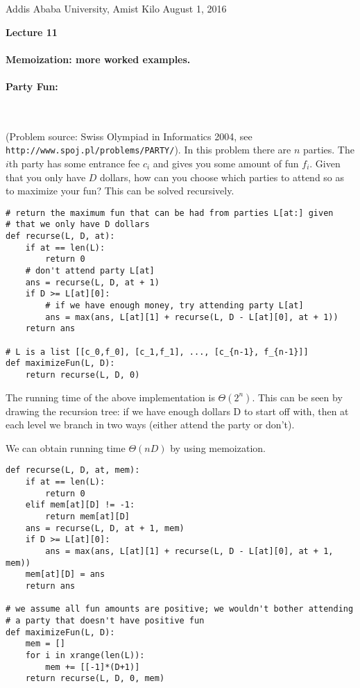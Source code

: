 \documentclass[11pt]{article}
\newlength{\toppush}
\newcommand{\htitle}[2]{\noindent\vspace*{-\toppush}\newline\parbox{6.5in}
 {\large Addis Ababa University, Amist Kilo \hfill #1\newline
\hspace*{\fill}{\bf Algorithms and Programming for High Schoolers} \hspace*{\fill} \newline
\mbox{}\hrulefill\mbox{}}\vspace*{1ex}\mbox{}\newline
\begin{center}{\Large\bf #2}\end{center}}
\begin{document}
\htitle{August 1, 2016}{Lecture 11}

\paragraph{\Large Memoization: more worked examples.}

\paragraph{Party Fun:}\ 

\smallskip

\noindent (Problem source: Swiss Olympiad in Informatics 2004, see
\texttt{http://www.spoj.pl/problems/PARTY/}).  In this problem there
are $n$ parties.  The $i$th party has some entrance fee $c_i$ and
gives you some amount of fun $f_i$.  Given that you only have $D$
dollars, how can you choose which parties to attend so as to maximize
your fun?  This can be solved recursively.

\begin{verbatim}
# return the maximum fun that can be had from parties L[at:] given
# that we only have D dollars
def recurse(L, D, at):
    if at == len(L):
        return 0
    # don't attend party L[at]
    ans = recurse(L, D, at + 1)
    if D >= L[at][0]:
        # if we have enough money, try attending party L[at]
        ans = max(ans, L[at][1] + recurse(L, D - L[at][0], at + 1))
    return ans

# L is a list [[c_0,f_0], [c_1,f_1], ..., [c_{n-1}, f_{n-1}]]
def maximizeFun(L, D):
    return recurse(L, D, 0)
\end{verbatim}

The running time of the above implementation is $\Theta(2^n)$.  This
can be seen by drawing the recursion tree: if we have enough dollars
D to start off with, then at each level we branch in two ways (either
attend the party or don't).

We can obtain running time $\Theta(nD)$ by using memoization.

\begin{verbatim}
def recurse(L, D, at, mem):
    if at == len(L):
        return 0
    elif mem[at][D] != -1:
        return mem[at][D]
    ans = recurse(L, D, at + 1, mem)
    if D >= L[at][0]:
        ans = max(ans, L[at][1] + recurse(L, D - L[at][0], at + 1, mem))
    mem[at][D] = ans
    return ans

# we assume all fun amounts are positive; we wouldn't bother attending
# a party that doesn't have positive fun
def maximizeFun(L, D):
    mem = []
    for i in xrange(len(L)):
        mem += [[-1]*(D+1)]
    return recurse(L, D, 0, mem)
\end{verbatim}
\end{document}

